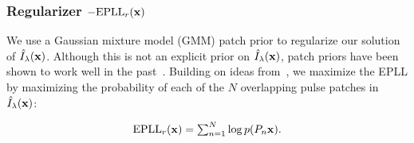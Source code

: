 {{\vspace{-.15in}
\subsubsection{Regularizer $- \mbox{EPLL}_r({\bf x})$ }


We use a Gaussian mixture model (GMM) patch prior to regularize our solution of $\hat{I}_{\lambda}({\bf x})$. Although this is not an explicit prior on $\hat{I}_{\lambda}({\bf x})$, patch priors have been shown to work well 
in the past~\cite{zoran2011learning, zoran2012natural}.  Building on ideas from~\cite{zoran2011learning}, we maximize the EPLL by maximizing the probability of each of the $N$ overlapping pulse patches in $\hat{I}_{\lambda}({\bf x})$:

\vspace{-.15in}
\begin{align}
\mbox{EPLL}_r({\bf x}) = \textstyle \sum_{n=1}^N  \log p(P_n {\bf x}).
\end{align}
\vspace{-.15in}








}}
